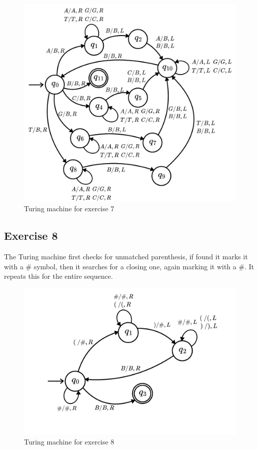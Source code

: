 \documentclass[a4paper]{article}
\begin{document}
\begin{figure}[ht!]
    \centering
    \includegraphics[scale = 0.3]{assets/Turing-1.jpeg}
    \caption{Turing machine for exercise 7}
\end{figure}

\newpage
\subsection{Exercise 8}

The Turing machine first checks for unmatched parenthesis, if found it marks it with a $\#$ symbol, then it searches for a closing one, again marking
it with a $\#$. It repeats this for the entire sequence.

\begin{figure}[ht!]
    \centering
    \includegraphics[scale = 0.2]{assets/Turing-2.jpeg}
    \caption{Turing machine for exercise 8}
\end{figure}
\end{document}
